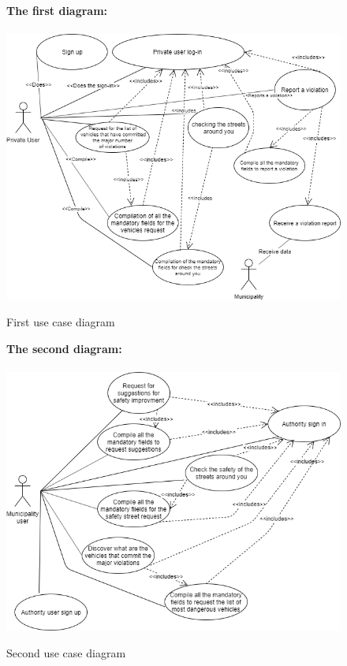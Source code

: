 \documentclass[titlepage]{article}
\begin{document}
\begin{figure}[h]
	\textbf{The first diagram:\\ \\}
	\includegraphics[scale=0.65]{use case diagrams/use case diagrams.png}
	\centering
	\caption{First use case diagram}
\end{figure}
\FloatBarrier

\begin{figure}[h]
	\textbf{The second diagram:\\ \\ }
	\includegraphics[scale=0.65]{use case diagrams/use-case2.png}
	\centering
	\caption{Second use case diagram}
\end{figure}
\FloatBarrier
\end{document}
